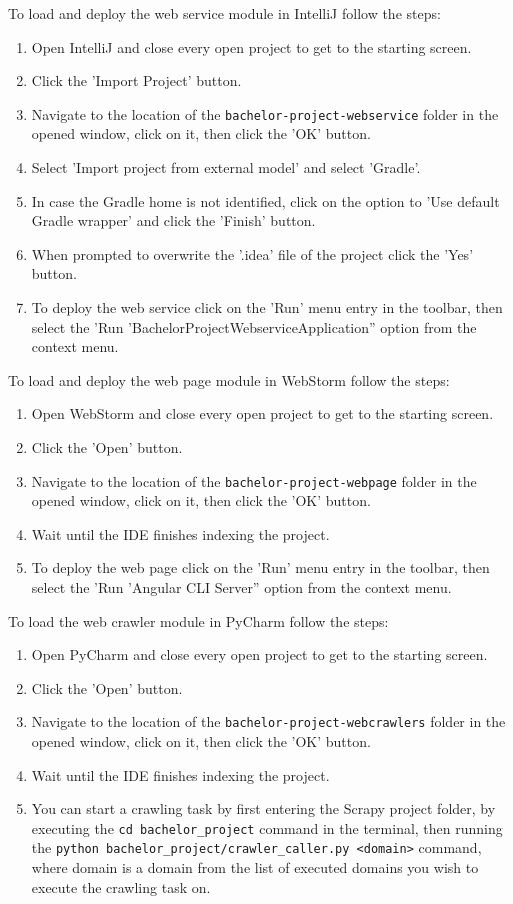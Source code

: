 \documentclass[12pt,a4paper,twoside]{report}
\begin{document}
To load and deploy the web service module in IntelliJ follow the steps:
\begin{enumerate}
  \item Open IntelliJ and close every open project to get to the starting screen.
  \item Click the 'Import Project' button.
  \item Navigate to the location of the \lstinline$bachelor-project-webservice$ folder in the opened window, click on it, then click the 'OK' button.
  \item Select 'Import project from external model' and select 'Gradle'.
  \item In case the Gradle home is not identified, click on the option to 'Use default Gradle wrapper' and click the 'Finish' button.
  \item When prompted to overwrite the '.idea' file of the project click the 'Yes' button.
  \item To deploy the web service click on the 'Run' menu entry in the toolbar, then select the 'Run 'BachelorProjectWebserviceApplication'' option from the context menu.
\end{enumerate}

To load and deploy the web page module in WebStorm follow the steps:
\begin{enumerate}
  \item Open WebStorm and close every open project to get to the starting screen.
  \item Click the 'Open' button.
  \item Navigate to the location of the \lstinline$bachelor-project-webpage$ folder in the opened window, click on it, then click the 'OK' button.
  \item Wait until the IDE finishes indexing the project.
  \item To deploy the web page click on the 'Run' menu entry in the toolbar, then select the 'Run 'Angular CLI Server'' option from the context menu.
\end{enumerate}

To load the web crawler module in PyCharm follow the steps:
\begin{enumerate}
  \item Open PyCharm and close every open project to get to the starting screen.
  \item Click the 'Open' button.
  \item Navigate to the location of the \lstinline$bachelor-project-webcrawlers$ folder in the opened window, click on it, then click the 'OK' button.
  \item Wait until the IDE finishes indexing the project.
  \item You can start a crawling task by first entering the Scrapy project folder, by executing the \lstinline$cd bachelor_project$ command in the terminal, then running the \lstinline$python bachelor_project/crawler_caller.py <domain>$ command, where domain is a domain from the list of executed domains you wish to execute the crawling task on.
\end{enumerate}
\end{document}
